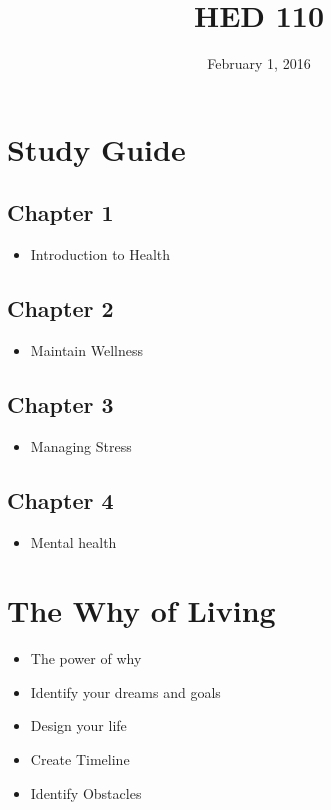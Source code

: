 \documentclass[]{article}
\title{HED 110}
\date {February 1, 2016}
\author{}
\begin{document}
\maketitle

\tableofcontents

\pagebreak

\section{Study Guide}

\subsection{Chapter 1}
\begin{itemize}
	\item Introduction to Health
\end{itemize}

\subsection{Chapter 2}
\begin{itemize}
	\item Maintain Wellness
\end{itemize}

\subsection{Chapter 3}
\begin{itemize}
	\item Managing Stress
\end{itemize}

\subsection{Chapter 4}
\begin{itemize}
	\item Mental health
\end{itemize}

\section{The Why of Living}
\begin{itemize}
	\item The power of why
	\item Identify your dreams and goals 
	\item Design your life 
	\item Create Timeline 
	\item Identify Obstacles 
\end{itemize}
\end{document}
